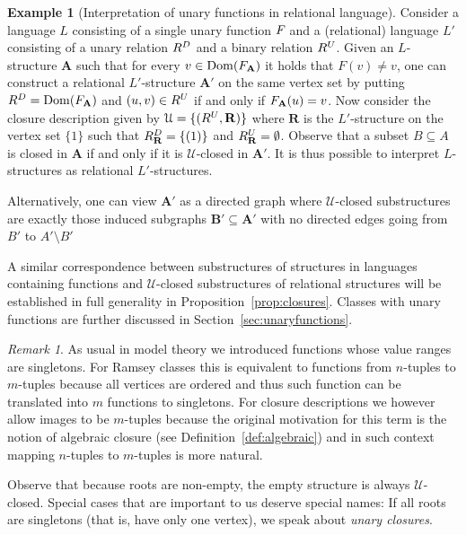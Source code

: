 \documentclass{elsarticle}
\def\dom{\mathop{\mathrm{Dom}}\nolimits}
\def\str#1{\mathbf {#1}}
\def\nbrel#1#2{R\ifstrempty{#1}{}{_{#1}}\ifstrempty{#2}{}{^{#2}}}
\def\rel#1#2{\nbrel{\ifstrempty{#1}{}{\str{#1}}}{#2}}
\def\func#1#2{\nbfunc{\ifstrempty{#1}{}{\str{#1}}}{#2}}
\def\nbfunc#1#2{F\ifstrempty{#1}{}{_{#1}}\ifstrempty{#2}{}{^{#2}}}
\theoremstyle{plain}
\theoremstyle{definition}
\newtheorem{example}[theorem]{Example}
\theoremstyle{remark}
\newtheorem*{remark}{Remark}
\begin{document}
\begin{example}[Interpretation of unary functions in relational language]
Consider a language $L$ consisting of a single unary function $\func{}{}$ and a (relational) language $L'$ consisting of a unary relation $\rel{}{D}$ and a binary relation $\rel{}{U}$.
Given an $L$-structure $\str{A}$ such that for every $v\in \dom(\func{A}{})$ it holds that $F(v)\neq v$, one can construct a relational $L'$-structure $\str{A}'$ on the same vertex set by putting $\rel{}{D}=\dom(\func{A}{})$ and $(u,v)\in \rel{}{U}$ if and only if $\func{A}{}(u)=v$.  Now consider the closure description given by $\mathcal U=\{(\rel{}{U},\str{R})\}$ where $\str{R}$ is the $L'$-structure on the vertex set $\{1\}$ such that $\rel{R}{D}=\{(1)\}$ and $\rel{R}{U}=\emptyset$. Observe that a subset $B\subseteq A$ is closed in $\str{A}$ if and only if it is $\mathcal U$-closed in $\str{A}'$.
It is thus possible to interpret $L$-structures as relational $L'$-structures.

Alternatively, one can view $\str{A}'$ as a directed graph where $\mathcal U$-closed substructures are exactly those induced subgraphs $\str{B}'\subseteq \str A'$ with no directed edges going from $B'$ to $A'\setminus B'$

A similar correspondence between substructures of structures in languages containing functions and $\mathcal U$-closed substructures of relational structures will be established in full generality in Proposition~\ref{prop:closures}. Classes with unary functions are further discussed in Section~\ref{sec:unaryfunctions}.
\end{example}

\begin{remark}
As usual in model theory we introduced functions whose value ranges are singletons. For Ramsey classes this is equivalent to functions from $n$-tuples to $m$-tuples because all
vertices are ordered and thus such function can be translated into $m$ functions to singletons. For closure descriptions we however allow images to be $m$-tuples because
the original motivation for this term is the notion of algebraic closure (see Definition~\ref{def:algebraic}) and in such context mapping $n$-tuples to $m$-tuples is more natural.
\end{remark}
Observe that because roots are non-empty, the empty structure is always $\mathcal U$-closed.
Special cases that are important to us deserve special names: If all roots are singletons (that is, have only one vertex), we speak about \emph{unary closures}. 
\end{document}
